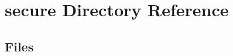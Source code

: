 \section{secure Directory Reference}
\label{dir_effc19b3709a36c2ce543998dd88e99f}
\subsection*{Files}
\begin{DoxyCompactItemize}
\end{DoxyCompactItemize}
